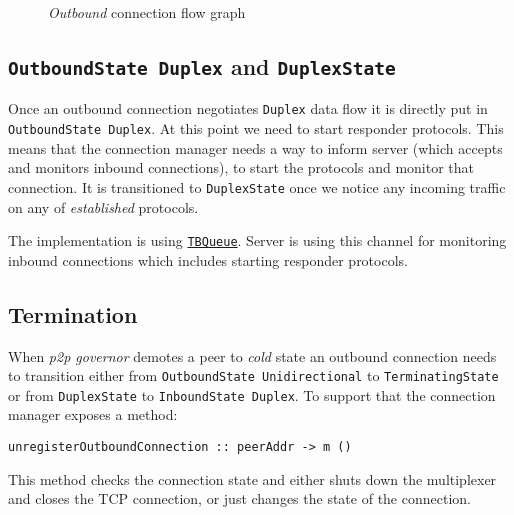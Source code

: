 \documentclass{article}
\def\TCP{\textsf{TCP}}
\def\OutboundStateUni{\texttt{OutboundState Unidirectional}}
\def\OutboundStateDup{\texttt{OutboundState Duplex}}
\def\DuplexState{\texttt{DuplexState}}
\def\InboundStateDup{\texttt{InboundState Duplex}}
\def\TerminatingState{\texttt{TerminatingState}}
\def\cold{\textit{cold}}
\def\established{\textit{established}}
\def\ptopgov{\textit{p2p governor}}
\begin{document}
\begin{figure}[p]
{}
  \caption{\textit{Outbound} connection flow graph}
\end{figure}

\subsection{\OutboundStateDup{} and \DuplexState{}}
Once an outbound connection negotiates \texttt{Duplex} data flow it is directly
put in \OutboundStateDup{}.
At this point we need to start responder protocols.  This means that the
connection manager needs a way to inform server (which accepts and monitors
inbound connections), to start the protocols and monitor that connection.  It
is transitioned to \DuplexState{} once we notice any incoming traffic on any
of \established{} protocols.

The implementation is using
\href{https://github.com/input-output-hk/ouroboros-network/blob/coot/connection-manager/ouroboros-network-framework/src/Ouroboros/Network/ConnectionManager/Server/ControlChannel.hs\#L123}{\texttt{TBQueue}}.
Server is using this channel for monitoring inbound connections which includes
starting responder protocols.

\subsection{Termination}\label{sec:outbound_termination}

When \ptopgov{} demotes a peer to \cold{} state an outbound
connection needs to transition either from \OutboundStateUni{} to
\TerminatingState{} or from \DuplexState{} to \InboundStateDup{}.  To
support that the connection manager exposes a method:
\begin{lstlisting}
unregisterOutboundConnection :: peerAddr -> m ()
\end{lstlisting}
This method checks the connection state and either shuts down the multiplexer
and closes the \TCP{} connection, or just changes the state of the connection.
\end{document}
